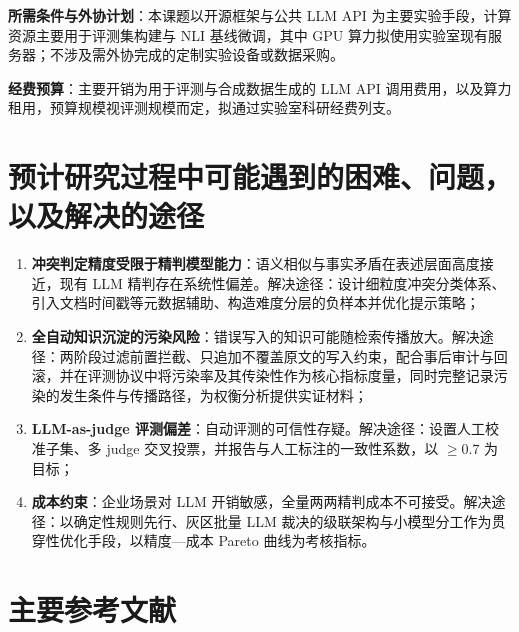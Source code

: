 \textbf{所需条件与外协计划}：本课题以开源框架与公共 LLM API 为主要实验手段，计算资源主要用于评测集构建与 NLI 基线微调，其中 GPU 算力拟使用实验室现有服务器；不涉及需外协完成的定制实验设备或数据采购。

\textbf{经费预算}：主要开销为用于评测与合成数据生成的 LLM API 调用费用，以及算力租用，预算规模视评测规模而定，拟通过实验室科研经费列支。

\section{预计研究过程中可能遇到的困难、问题，以及解决的途径}

\begin{enumerate}
  \item \textbf{冲突判定精度受限于精判模型能力}：语义相似与事实矛盾在表述层面高度接近，现有 LLM 精判存在系统性偏差。解决途径：设计细粒度冲突分类体系、引入文档时间戳等元数据辅助、构造难度分层的负样本并优化提示策略；
  \item \textbf{全自动知识沉淀的污染风险}：错误写入的知识可能随检索传播放大。解决途径：两阶段过滤前置拦截、只追加不覆盖原文的写入约束，配合事后审计与回滚，并在评测协议中将污染率及其传染性作为核心指标度量，同时完整记录污染的发生条件与传播路径，为权衡分析提供实证材料；
  \item \textbf{LLM-as-judge 评测偏差}：自动评测的可信性存疑。解决途径：设置人工校准子集、多 judge 交叉投票，并报告与人工标注的一致性系数，以 $\geq 0.7$ 为目标；
  \item \textbf{成本约束}：企业场景对 LLM 开销敏感，全量两两精判成本不可接受。解决途径：以确定性规则先行、灰区批量 LLM 裁决的级联架构与小模型分工作为贯穿性优化手段，以精度—成本 Pareto 曲线为考核指标。
\end{enumerate}

\section{主要参考文献}




